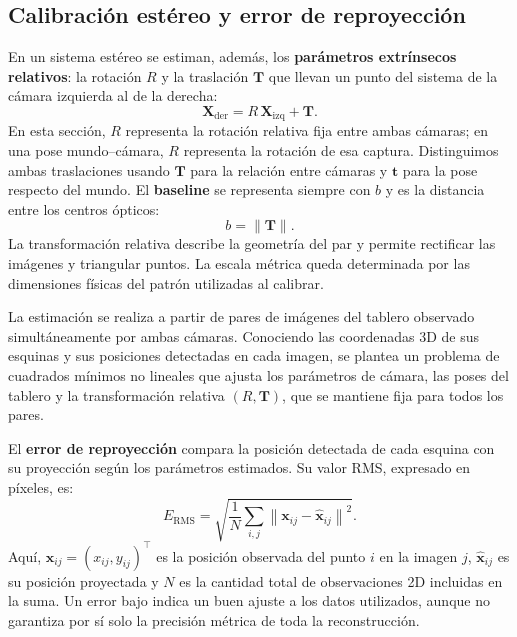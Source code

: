 \documentclass[a4paper,11pt]{article}
\begin{document}
\subsection{Calibración estéreo y error de reproyección}
En un sistema estéreo se estiman, además, los \textbf{parámetros extrínsecos relativos}: la rotación $R$ y la traslación $\mathbf{T}$ que llevan un punto del sistema de la cámara izquierda al de la derecha:
\begin{equation}
\mathbf{X}_{\mathrm{der}} = R\,\mathbf{X}_{\mathrm{izq}} + \mathbf{T}.
\end{equation}
En esta sección, $R$ representa la rotación relativa fija entre ambas cámaras; en una pose mundo--cámara, $R$ representa la rotación de esa captura. Distinguimos ambas traslaciones usando $\mathbf{T}$ para la relación entre cámaras y $\mathbf{t}$ para la pose respecto del mundo. El \textbf{baseline} se representa siempre con $b$ y es la distancia entre los centros ópticos:
\begin{equation}
b = \|\mathbf{T}\|.
\end{equation}
La transformación relativa describe la geometría del par y permite rectificar las imágenes y triangular puntos. La escala métrica queda determinada por las dimensiones físicas del patrón utilizadas al calibrar.

La estimación se realiza a partir de pares de imágenes del tablero observado simultáneamente por ambas cámaras. Conociendo las coordenadas 3D de sus esquinas y sus posiciones detectadas en cada imagen, se plantea un problema de cuadrados mínimos no lineales que ajusta los parámetros de cámara, las poses del tablero y la transformación relativa $(R,\mathbf{T})$, que se mantiene fija para todos los pares.

El \textbf{error de reproyección} compara la posición detectada de cada esquina con su proyección según los parámetros estimados. Su valor RMS, expresado en píxeles, es:
\begin{equation}
E_{\mathrm{RMS}} = \sqrt{\frac{1}{N}\sum_{i,j}
\left\lVert \mathbf{x}_{ij}-\hat{\mathbf{x}}_{ij} \right\rVert^2}.
\end{equation}
Aquí, $\mathbf{x}_{ij}=(x_{ij},y_{ij})^\top$ es la posición observada del punto $i$ en la imagen $j$, $\hat{\mathbf{x}}_{ij}$ es su posición proyectada y $N$ es la cantidad total de observaciones 2D incluidas en la suma. Un error bajo indica un buen ajuste a los datos utilizados, aunque no garantiza por sí solo la precisión métrica de toda la reconstrucción.
\end{document}
